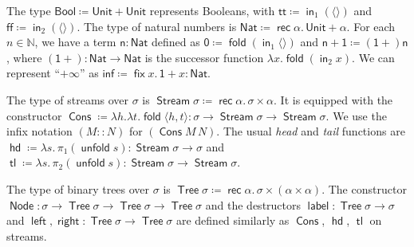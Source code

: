 \documentclass[%
  a4paper,
  UKenglish,
  cleveref,
  autoref,
  thm-restate,
  numberwithinsect,
]{lipics-v2021}
\newcommand\deq\coloneqq
\newcommand\pair[1]{{\langle #1\rangle}}
\newcommand\NN{\mathbb{N}}
\newcommand\term[1]{\mathsf{#1}}
\newcommand\type[1]{\term{#1}}
\newcommand\inj{\mathop{\term{in}}}
\newcommand\fix{\mathop{\term{fix}}}
\newcommand\fold{\mathop{\term{fold}}}
\newcommand\unfold{\mathop{\term{unfold}}}
\newcommand\Colon{\mathrel{::}}
\newcommand\Cons{\mathop{\term{Cons}}}
\newcommand\hd{\mathop{\term{hd}}}
\newcommand\tl{\mathop{\term{tl}}}
\newcommand\Node{\mathop{\term{Node}}}
\newcommand\lbl{\mathop{\term{label}}}
\newcommand\lft{\mathop{\term{left}}}
\newcommand\rght{\mathop{\term{right}}}
\newcommand\arrow\to
\newcommand\Unit{\type{Unit}}
\newcommand\Bool{\type{Bool}}
\newcommand\Nat{\type{Nat}}
\newcommand\Stream{\mathop{\type{Stream}}}
\newcommand\Tree{\mathop{\type{Tree}}}
\newcommand\rec{\mathop{\type{rec}}}	%
\newcommand\TV{\alpha}		%
\newcommand\true{\term{tt}}
\newcommand\false{\term{ff}}
\newcommand\PTbis{\sigma}	%
\begin{document}
\begin{example}
\label{ex:pure}
The type $\Bool \deq \Unit + \Unit$ represents Booleans, 
with $\true \deq \inj_1(\pair{})$
and $\false \deq \inj_2(\pair{})$.
The type of natural numbers
is $\Nat \deq \rec \TV.\, \Unit + \TV$.
For each $n \in \NN$, we have a term $\term n \colon \Nat$
defined as $\term 0 \deq \fold(\inj_1 \pair{})$
and $\term{n+1} \deq \term{(1+)} \term n$,
where $\term{(1+)} \colon \Nat \to \Nat$
is the successor function $\lambda x. \fold(\inj_2 x)$.
We can represent ``$+\infty$'' as
$\term{inf} \deq \fix x.\, \term{1+}x \colon \Nat$.

The type of streams over $\PTbis$ is
$\Stream\PTbis \deq \rec\TV.\, \PTbis \times \TV$.
It is equipped with the constructor
\(
  \Cons
  \deq
  \lambda h .\lambda t.\fold \pair{h,t}
  \colon
  \PTbis \arrow \Stream\PTbis \arrow \Stream \PTbis
\).
We use the infix notation $(M \Colon N)$ for $(\Cons M\, N)$.
The usual \emph{head} and \emph{tail} functions
are
$\hd \deq \lambda s.\, \pi_1 (\unfold s) \colon \Stream\PTbis \arrow \PTbis$
and
$\tl \deq \lambda s.\, \pi_2 (\unfold s) \colon \Stream\PTbis \arrow \Stream\PTbis$.

The type of binary trees over $\PTbis$ is
$\Tree\PTbis \deq \rec\TV.\, \PTbis \times (\TV \times \TV)$.
The constructor
$\Node \colon \PTbis \arrow \Tree\PTbis \arrow \Tree\PTbis \arrow \Tree\PTbis$
and the destructors
$\lbl \colon \Tree\PTbis \arrow \PTbis$
and
$\lft, \rght \colon \Tree\PTbis \arrow \Tree\PTbis$
are defined similarly as $\Cons$, $\hd$, $\tl$ on streams.
\lipicsEnd
\end{example}
\end{document}
